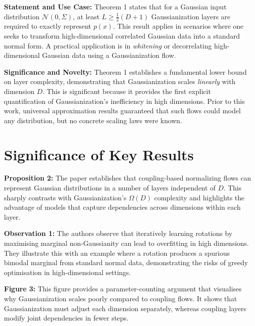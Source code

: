 \textbf{Statement and Use Case:} Theorem 1 states that for a Gaussian input distribution $\mathcal{N}(0, \Sigma)$, at least $L \geq \frac{1}{2} (D+1)$ Gaussianization layers are required to exactly represent $p(x)$. This result applies in scenarios where one seeks to transform high-dimensional correlated Gaussian data into a standard normal form. A practical application is in \textit{whitening} or decorrelating high-dimensional Gaussian data using a Gaussianization flow.

\textbf{Significance and Novelty:} Theorem 1 establishes a fundamental lower bound on layer complexity, demonstrating that Gaussianization scales \textit{linearly} with dimension $D$. This is significant because it provides the first explicit quantification of Gaussianization's inefficiency in high dimensions. Prior to this work, universal approximation results guaranteed that such flows could model any distribution, but no concrete scaling laws were known.

\section{Significance of Key Results}

\textbf{Proposition 2:} The paper establishes that coupling-based normalizing flows can represent Gaussian distributions in a number of layers independent of $D$. This sharply contrasts with Gaussianization's $\Omega(D)$ complexity and highlights the advantage of models that capture dependencies across dimensions within each layer.

\textbf{Observation 1:} The authors observe that iteratively learning rotations by maximising marginal non-Gaussianity can lead to overfitting in high dimensions. They illustrate this with an example where a rotation produces a spurious bimodal marginal from standard normal data, demonstrating the risks of greedy optimisation in high-dimensional settings.

\textbf{Figure 3:} This figure provides a parameter-counting argument that visualises why Gaussianization scales poorly compared to coupling flows. It shows that Gaussianization must adjust each dimension separately, whereas coupling layers modify joint dependencies in fewer steps.
